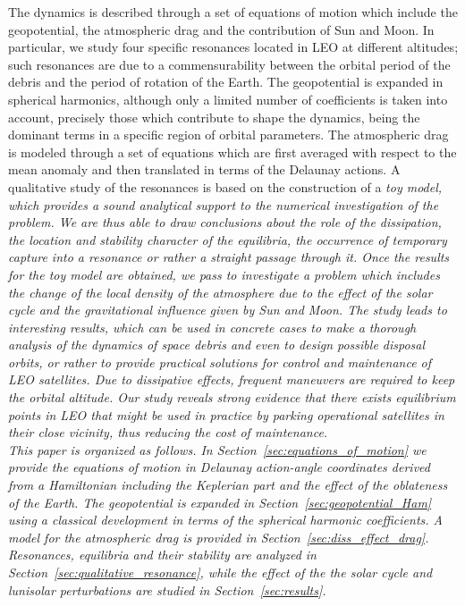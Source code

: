 \documentclass[12pt,reqno]{amsart}
\numberwithin{equation}{section}
\begin{document}
The dynamics is described through
a set of equations of motion which include the geopotential, the
atmospheric drag and the contribution of Sun and Moon. In particular,
we study four specific resonances located in LEO at different altitudes;
such resonances are due to a commensurability between the orbital period of
the debris and the period of rotation of the Earth. The geopotential is
expanded in spherical harmonics, although only a limited number of
coefficients is taken into account, precisely those which contribute to shape
the dynamics, being the dominant terms in a specific region of orbital parameters.
The atmospheric drag is modeled through a set of equations which are first
averaged with respect to the mean anomaly and then translated in terms of
the Delaunay actions. A qualitative study of the resonances is based on
the construction of a \sl toy model, \rm which provides a sound analytical
support to the numerical investigation of the problem. We are thus able
to draw conclusions about the role of the dissipation, the location and
stability character of the equilibria, the occurrence of temporary
capture into a resonance or rather a straight passage through it.
Once the results for the toy model are obtained, we pass to investigate a
problem which includes the change of the local density of the atmosphere
due to the effect of the solar cycle and the gravitational influence
given by Sun and Moon. The study leads to interesting results, which
can be used in concrete cases to make a thorough analysis of the
dynamics of space debris and even to design possible disposal orbits, or rather to provide practical solutions for control
and maintenance of LEO satellites. Due to dissipative effects, frequent maneuvers are required to keep the
orbital altitude. Our study reveals strong evidence that there exists equilibrium points in LEO that might be used in practice by parking operational satellites in their close vicinity,
thus reducing the cost of maintenance.\\

This paper is organized as follows.
In Section~\ref{sec:equations_of_motion} we provide the equations of motion
in Delaunay action-angle coordinates derived from a Hamiltonian including the
Keplerian part and the effect of the oblateness of the Earth. The geopotential
is expanded in Section~\ref{sec:geopotential_Ham} using a classical development
in terms of the spherical harmonic coefficients. A model for the atmospheric
drag is provided in Section~\ref{sec:diss_effect_drag}. Resonances, equilibria
and their stability are analyzed in Section~\ref{sec:qualitative_resonance},
while the effect of the the solar cycle and lunisolar perturbations are
studied in Section~\ref{sec:results}.
\end{document}
